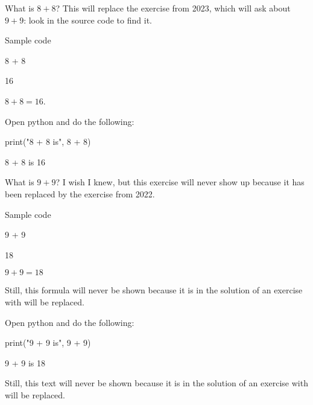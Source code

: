 \documentclass{book}
\begin{document}
\begin{exercise}[examdate={January 16, 2022}, examproblemnumber={1}, examproblemid={2022-01-16-01}]
  What is \(8 + 8\)? This will replace the exercise from 2023, which will ask about \(9 + 9\): look in the source code to find it.

Sample code
\begin{pycell}
8 + 8
\end{pycell}
\begin{pyexpectedoutput}
16
\end{pyexpectedoutput}
\end{exercise}

\begin{solution}
  \(8 + 8 = 16\).
\end{solution}

\begin{additionalinformation}
Open python and do the following:

\begin{pycell}
print("8 + 8 is", 8 + 8)
\end{pycell}
\begin{pyexpectedoutput}
8 + 8 is 16
\end{pyexpectedoutput}
\end{additionalinformation}

\begin{exercise}[examdate={January 16, 2023}, examproblemnumber={1}, examproblemid={2023-01-16-01}, replacedbyexamproblemid={2022-01-16-01}, replacementsinceacademicyear={2025/2026}]
  What is \(9 + 9\)? I wish I knew, but this exercise will never show up because it has been replaced by the exercise from 2022.

Sample code
\begin{pycell}
9 + 9
\end{pycell}
\begin{pyexpectedoutput}
18
\end{pyexpectedoutput}
\end{exercise}

\begin{solution}
  \(9 + 9 = 18\)

Still, this formula will never be shown because it is in the solution of an exercise with will be replaced.
\end{solution}

\begin{additionalinformation}
Open python and do the following:

\begin{pycell}
print("9 + 9 is", 9 + 9)
\end{pycell}
\begin{pyexpectedoutput}
9 + 9 is 18
\end{pyexpectedoutput}

Still, this text will never be shown because it is in the solution of an exercise with will be replaced.
\end{additionalinformation}
\end{document}

